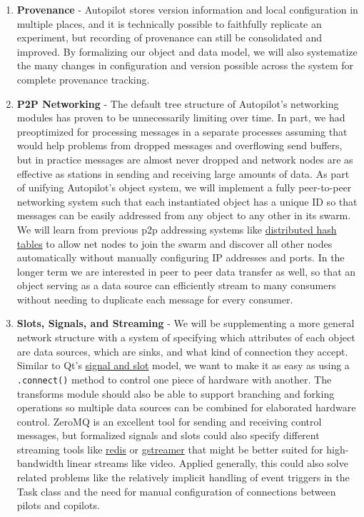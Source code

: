 \begin{enumerate}[ref=\thechapter.\arabic*]
    \item \label{future:provenance}\textbf{Provenance} - Autopilot stores version information and local configuration in multiple places, and it is technically possible to faithfully replicate an experiment, but recording of provenance can still be consolidated and improved. By formalizing our object and data model, we will also systematize the many changes in configuration and version possible across the system for complete provenance tracking.
    \item \label{future:network}\textbf{P2P Networking} - The default tree structure of Autopilot's networking modules has proven to be unnecessarily limiting over time. In part, we had preoptimized for processing messages in a separate processes assuming that would help problems from dropped messages and overflowing send buffers, but in practice messages are almost never dropped and network nodes are as effective as stations in sending and receiving large amounts of data. As part of unifying Autopilot's object system, we will implement a fully peer-to-peer networking system such that each instantiated object has a unique ID so that messages can be easily addressed from any object to any other in its swarm. We will learn from previous p2p addressing systems like \href{https://en.wikipedia.org/wiki/Distributed\_hash\_table}{distributed hash tables} to allow net nodes to join the swarm and discover all other nodes automatically without manually configuring IP addresses and ports. In the longer term we are interested in peer to peer data transfer as well, so that an object serving as a data source can efficiently stream to many consumers without needing to duplicate each message for every consumer.
    \item \label{future:slots}\textbf{Slots, Signals, and Streaming} - We will be supplementing a more general network structure with a system of specifying which attributes of each object are data sources, which are sinks, and what kind of connection they accept. Similar to Qt's \href{https://doc.qt.io/qt-6/signalsandslots.html}{signal and slot} model, we want to make it as easy as using a \texttt{.connect()} method to control one piece of hardware with another. The transforms module should also be able to support branching and forking operations so multiple data sources can be combined for elaborated hardware control. ZeroMQ is an excellent tool for sending and receiving control messages, but formalized signals and slots could also specify different streaming tools like \href{https://redis.io/}{redis} or \href{https://gstreamer.freedesktop.org/}{gstreamer} that might be better suited for high-bandwidth linear streams like video. Applied generally, this could also solve related problems like the relatively implicit handling of event triggers in the Task class and the need for manual configuration of connections between pilots and copilots.

\end{enumerate}
